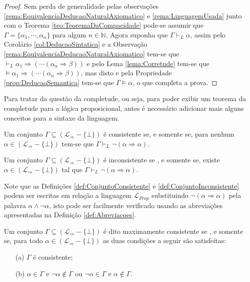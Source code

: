 \begin{proof}
    Sem perda de generalidade pelas observações \ref{rema:EquivalenciaDeducaoNaturalAxiomatico} e \ref{rema:LinguagemUsada} junto com o Teorema \ref{teo:TeoremaDaCompacidade} pode-se assumir que $\Gamma = \{\alpha_1, \cdots, \alpha_n\}$ para algum $n \in \mathbb{N}$. Agora suponha que $\Gamma \vdash_L \alpha$, assim pelo Corolário \ref{col:DeducaoSintatica} e a Observação \ref{rema:EquivalenciaDeducaoNaturalAxiomatico} tem-se que $\vdash_L \alpha_1 \Rightarrow ( \cdots ( \alpha_n \Rightarrow \beta))$ e pelo Lema \ref{lema:Corretude} tem-se que $\vDash \alpha_1 \Rightarrow ( \cdots ( \alpha_n \Rightarrow \beta))$, mas disto e pela Propriedade \ref{prop:DeducaoSemantica} tem-se que  $\Gamma \vDash \alpha$, o que completa a prova.
\end{proof}

Para tratar da questão da completude, ou seja, para poder exibir um teorema da completude para a lógica proposicional, antes é necessário adicionar mais alguns conceitos para a sintaxe da linguagem.

\begin{definition}\label{def:ConjuntoConsistente}
    Um conjunto $\Gamma \subseteq (\mathcal{L}_{\Rightarrow} - \{\bot\})$ é consistente se, e somente se, para nenhum $\alpha \in (\mathcal{L}_{\Rightarrow} - \{\bot\})$ tem-se que $\Gamma \vdash_L \neg (\alpha \Rightarrow \alpha)$.
\end{definition}

\begin{definition}\label{def:ConjuntoInconsistente}
    Um conjunto $\Gamma \subseteq (\mathcal{L}_{\Rightarrow} - \{\bot\})$ é inconsistente se , e somente se, existe $\alpha \in (\mathcal{L}_{\Rightarrow} - \{\bot\})$ tal que $\Gamma \vdash_L \neg (\alpha \Rightarrow \alpha)$.
\end{definition}

\begin{rema}
    Note que as Definições \ref{def:ConjuntoConsistente} e \ref{def:ConjuntoInconsistente} podem ser escritas em relação a linguagem $\mathcal{L}_{Prop}$ substituindo $\neg (\alpha \Rightarrow \alpha)$ pela palavra $\alpha \land \neg \alpha$, isto pode ser facilmente verificado usando as abreviações apresentadas na Definição \ref{def:Abreviacoes}.
\end{rema}

\begin{definition}\label{def:ConjuntoMaxConsistente}
    Um conjunto $\Gamma \subseteq (\mathcal{L}_{\Rightarrow} - \{\bot\})$ é dito maximamente consistente se , e somente se, para todo $\alpha \in (\mathcal{L}_{\Rightarrow} - \{\bot\})$ as duas condições a seguir são satisfeitas:
    \begin{itemize}
        \item[(a)] $\Gamma$ é consistente;
        \item[(b)] $\alpha \in \Gamma$ e $\neg \alpha \notin \Gamma$ ou $\neg \alpha \in \Gamma$ e $\alpha \notin \Gamma$.
    \end{itemize}
\end{definition}

